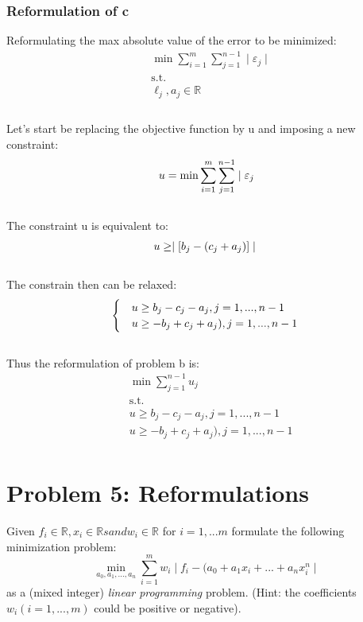 \documentclass[12pt]{article}
\begin{document}
\subsubsection{Reformulation of c}
Reformulating the max absolute value of the error to be minimized: 
    \begin{align*}
            &\min \sum_{i=1}^{m}\sum_{j=1}^{n-1} \mid \varepsilon_j \mid\\
            &\text{s.t.}\\
            &\ell_j, a_j \in \mathbb{R} \\
    \end{align*}\\
Let's start be replacing the objective function by u and imposing a new constraint:\\
    \begin{equation*}
        u = \min \sum_{i=1}^{m}\sum_{j=1}^{n-1} \mid \varepsilon_j\\
    \end{equation*}\\
The constraint u is equivalent to:\\
    \begin{equation*}
        u \geq \mid [b_j-(c_j + a_j)]\mid\\
    \end{equation*}\\
The constrain then can be relaxed:\\
   \begin{equation*}
        \begin{cases}
            &u \geq b_j - c_j - a_j  , j = 1,...,n-1\\
            &u \geq -b_j + c_j + a_j), j = 1,...,n-1\\
        \end{cases}\\
    \end{equation*}\\
Thus the reformulation of problem b is: 
    \begin{align*}
        &\min \sum_{j=1}^{n-1} u_j\\
        &\text{s.t.}\\
        &u \geq b_j - c_j - a_j  , j = 1,...,n-1\\
        &u \geq -b_j + c_j + a_j), j = 1,...,n-1\\
    \end{align*}



\section{Problem 5: Reformulations}
    Given  \( f_i \in \mathbb{R}, x_i \in \mathbb{R}s and w_i \in \mathbb{R} \) for \( i = 1,...m \) formulate the following minimization problem:\\
    \begin{equation*}
        \min_{a_0,a_1,...,a_n} \sum_{i=1}^{m} w_i \mid f_i -  (a_0 + a_1 x_i + ... + a_nx_i^n \mid
    \end{equation*}
    as a (mixed integer) \textit{linear programming} problem. (Hint: the coefficients \( w_i (i = 1,...,m) \) could be positive or negative).
    
\end{document}
